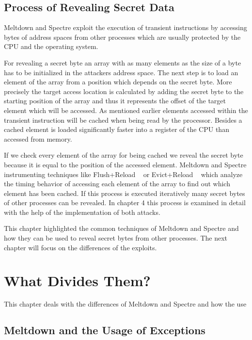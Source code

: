 \documentclass[a4paper,oneside,openright] {scrreprt}
\begin{document}
\subsection{Process of Revealing Secret Data}
\label{ch:intro:motivation:A}

Meltdown and Spectre exploit the execution of transient instructions by accessing bytes of address spaces 
from other processes which are usually protected by the CPU and the operating system. 

For revealing a secret byte an array with as many elements as the size of a byte has to be initialized in the attackers address space. 
The next step is to load an element of the array from a position which depends on the secret byte. 
More precisely the target access location is calculated by adding the secret byte to the starting position of the array and
 thus it represents the offset of the target element which will be accessed. As mentioned earlier elements accessed within the transient
 instruction will be cached when being read by the processor. 
 Besides a cached element is loaded significantly faster into a register of the CPU than accessed from memory.
 
If we check every element of the array for being cached we reveal the secret byte 
 because it is equal to the position of the accessed element.
Meltdown and Spectre instrumenting techniques like Flush+Reload ~\cite{yarom2014flush} 
or Evict+Reload ~\cite{gruss2015cache} which analyze the timing behavior of accessing each element of the array 
to find out which element has been cached.
If this process is executed iteratively many secret bytes of other processes can be revealed. 
In chapter 4 this process is examined in detail with the help of the implementation of both attacks.

This chapter highlighted the common techniques of Meltdown and Spectre and how they can be used to reveal secret bytes from other
processes. The next chapter will focus on the differences of the exploits.

\section{What Divides Them?}
\label{ch:intro:motivation}

This chapter deals with the differences of Meltdown and Spectre and how the use  

\subsection{Meltdown and the Usage of Exceptions}
\label{ch:intro:motivation:A}
\end{document}
